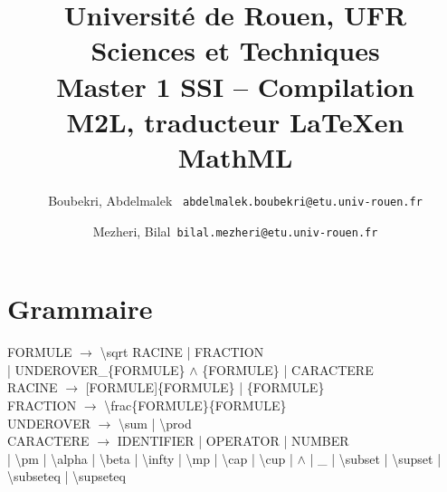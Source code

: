 \documentclass[12pt,a4paper]{article}
\author{
	Boubekri, Abdelmalek \     \texttt{abdelmalek.boubekri@etu.univ-rouen.fr}
	\and
	Mezheri, Bilal\   		   \texttt{bilal.mezheri@etu.univ-rouen.fr}
}
\title{	Université de Rouen, UFR Sciences et Techniques\\
		Master 1 SSI – Compilation\\
		M2L, traducteur \LaTeX en MathML\\ }
\begin{document}
	
	\maketitle
	\tableofcontents

\section{Grammaire}

FORMULE 	$\rightarrow$ \textbackslash sqrt RACINE | FRACTION \\
 
 | UNDEROVER\_\{FORMULE\} $\wedge$ \{FORMULE\} | CARACTERE\\
 
RACINE		$\rightarrow$ [FORMULE]\{FORMULE\} | \{FORMULE\}\\

FRACTION	$\rightarrow$ \textbackslash frac\{FORMULE\}\{FORMULE\}\\

UNDEROVER	$\rightarrow$ \textbackslash sum | \textbackslash prod \\

CARACTERE	$\rightarrow$ IDENTIFIER | OPERATOR | NUMBER\\
 | \textbackslash pm | \textbackslash alpha | \textbackslash beta | \textbackslash infty |  \textbackslash mp | \textbackslash cap | \textbackslash cup | $\wedge$ | \_ | \textbackslash subset  | \textbackslash supset  | \textbackslash subseteq | \textbackslash supseteq

	
	
\end{document}
